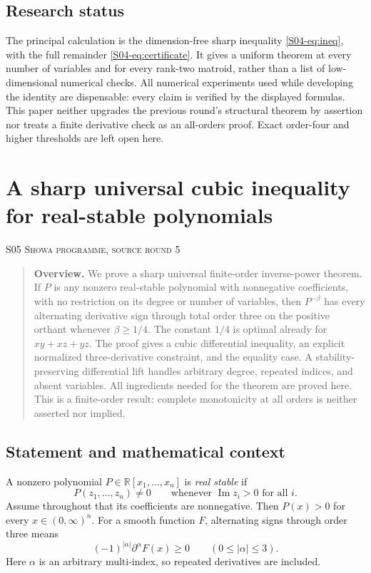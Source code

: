 \documentclass[11pt,a4paper]{article}
\theoremstyle{definition}\newtheorem{definition}[theorem]{Definition}
\theoremstyle{remark}\newtheorem{remark}[theorem]{Remark}
\newcommand{\R}{\mathbb R}\newcommand{\C}{\mathbb C}\newcommand{\N}{\mathbb N}
\numberwithin{equation}{section}
\begin{document}
\subsection{Research status}\label{S04-sec-6}
The principal calculation is the dimension-free sharp inequality \eqref{S04-eq:ineq}, with the full remainder \eqref{S04-eq:certificate}. It gives a uniform theorem at every number of variables and for every rank-two matroid, rather than a list of low-dimensional numerical checks. All numerical experiments used while developing the identity are dispensable: every claim is verified by the displayed formulas. This paper neither upgrades the previous round's structural theorem by assertion nor treats a finite derivative check as an all-orders proof. Exact order-four and higher thresholds are left open here.





\clearpage
\section[S05 --- A sharp universal cubic inequality for real-stable polynomials]{A sharp universal cubic inequality for real-stable polynomials}\label{contrib-S05}
\noindent\textsc{S05 \quad Showa programme, source round 5}\par\medskip



\begin{quote}\small\textbf{Overview.} We prove a sharp universal finite-order inverse-power theorem. If $P$ is any nonzero real-stable polynomial with nonnegative coefficients, with no restriction on its degree or number of variables, then $P^{-\beta}$ has every alternating derivative sign through total order three on the positive orthant whenever $\beta\ge1/4$. The constant $1/4$ is optimal already for $xy+xz+yz$. The proof gives a cubic differential inequality, an explicit normalized three-derivative constraint, and the equality case. A stability-preserving differential lift handles arbitrary degree, repeated indices, and absent variables. All ingredients needed for the theorem are proved here. This is a finite-order result: complete monotonicity at all orders is neither asserted nor implied.\end{quote}

\subsection{Statement and mathematical context}\label{S05-sec-1}
A nonzero polynomial $P\in\R[x_1,\ldots,x_n]$ is \emph{real stable} if
\[
 P(z_1,\ldots,z_n)\ne0\qquad\text{whenever }\operatorname{Im}z_i>0\text{ for all }i.
\]
Assume throughout that its coefficients are nonnegative. Then $P(x)>0$ for every $x\in(0,\infty)^n$. For a smooth function $F$, alternating signs through order three means
\[
 (-1)^{|\alpha|}\partial^\alpha F(x)\ge0\qquad(0\le|\alpha|\le3).
\]
Here $\alpha$ is an arbitrary multi-index, so repeated derivatives are included.
\end{document}

